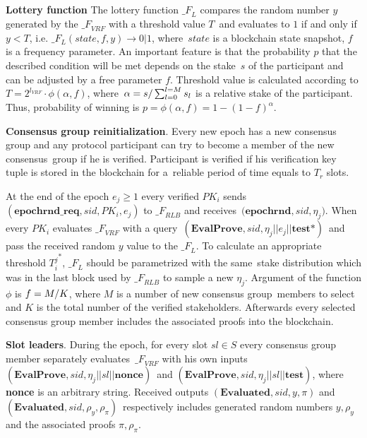 \textbf{Lottery function}
The lottery function ${\mathcal_{F}}_{L}$ compares the random number $y$ generated by the ${\mathcal_{F}}_{VRF}$ with a threshold value $T$\
and evaluates to $1$ if and only if ${y < T}$, i.e. ${\mathcal_{F}}_{L}(state, f, y) \rightarrow 0|1$, where\
$state$ is a blockchain state snapshot, $f$ is a frequency parameter.
An important feature is that the probability $p$ that the described condition will be met depends on the stake\
$s$ of the participant and can be adjusted by a free parameter $f$.
Threshold value is calculated according to ${T = 2^{l_{VRF}}\cdot \phi(\alpha, f)}$, where\
${\alpha=s/\\\sum_{l=0}^{l=M} s_l}$ is a relative stake of the participant.
Thus, probability of winning is ${p = \phi(\alpha, f) = 1-(1-f)^{\alpha}}$.

\textbf{Consensus group reinitialization}.
Every new epoch has a new consensus group and any protocol participant can try to become a member of the new consensus\
group if he is verified.
Participant is verified if his verification key tuple is stored in the blockchain for a\
reliable period of time equals to $T_r$ slots.

At the end of the epoch ${e_j \geqslant 1}$ every verified $PK_i$ sends\
${(\textbf{epochrnd\_req}, sid, PK_i, e_j)}$ to ${\mathcal_{F}}_{RLB}$ and receives\
$({\textbf{epochrnd}, sid, \eta_j)}$.
When every $PK_i$ evaluates ${\mathcal_{F}}_{VRF}$ with a query\
${(\textbf{EvalProve}, sid, \eta_j || e_j || \textbf{test*})}$\
and pass the received random $y$ value to the ${\mathcal_{F}}_{L}$.
To calculate an appropriate threshold ${T_i^j}^*$, ${\mathcal_{F}}_{L}$ should be parametrized with the same\
stake distribution which was in the last block used by ${\mathcal_{F}}_{RLB}$ to sample a new $\eta_j$.
Argument of the function $\phi$ is ${f = M /\/ K}$, where $M$ is a number of new consensus group\
members to select and $K$ is the total number of the verified stakeholders.
Afterwards every selected consensus group member includes the associated proofs into the blockchain.

\textbf{Slot leaders}.
During the epoch, for every slot ${sl \in S}$ every consensus group member separately evaluates\
${\mathcal_{F}}_{VRF}$ with his own inputs ${(\textbf{EvalProve}, sid, \eta_j || sl || \textbf{nonce})}$\
and ${(\textbf{EvalProve}, sid, \eta_j || sl || \textbf{test})}$, where \textbf{nonce} is an arbitrary string.
Received outputs ${(\textbf{Evaluated}, sid, y, \pi)}$ and ${(\textbf{Evaluated}, sid, \rho_y, \rho_\pi)}$\
respectively includes generated random numbers ${y, \rho_y}$ and the associated proofs ${\pi, \rho_\pi}$.

